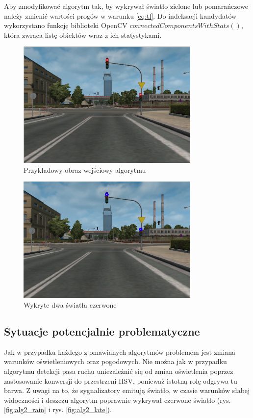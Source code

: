 Aby zmodyfikować algorytm tak, by wykrywał światło zielone lub pomarańczowe należy zmienić wartości progów w warunku \ref{eq:tl}. 
Do indeksacji kandydatów wykorzystano funkcję biblioteki OpenCV $connectedComponentsWithStats()$, która zwraca listę obiektów wraz z ich statystykami.

\begin{figure}
  \centering
  \includegraphics[width=9cm]{img/alg2_input.jpg}
  \caption{Przykładowy obraz wejściowy algorytmu}
  \label{fig:alg2_input}
\end{figure}

\begin{figure}
  \centering
  \includegraphics[width=9cm]{img/alg2_res.jpg}
  \caption{Wykryte dwa światła czerwone}
  \label{fig:alg2_res}
\end{figure}

\subsection{Sytuacje potencjalnie problematyczne}
Jak w przypadku każdego z omawianych algorytmów problemem jest zmiana warunków oświetleniowych oraz pogodowych. 
Nie można jak w przypadku algorytmu detekcji pasa ruchu uniezależnić się od zmian oświetlenia poprzez zastosowanie konwersji do przestrzeni HSV, ponieważ istotną rolę odgrywa tu barwa. %
Z uwagi na to, że sygnalizatory emitują światło, w czasie warunków słabej widoczności i deszczu algorytm poprawnie wykrywał czerwone światło (rys. \ref{fig:alg2_rain} i rys. \ref{fig:alg2_late}).

